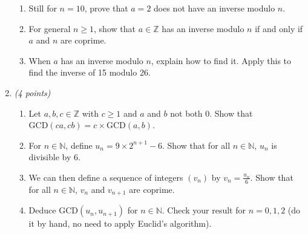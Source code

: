 \documentclass[12pt]{article}
\newcommand{\GCD}{\mathrm{GCD}}
\begin{document}
\begin{enumerate}
\begin{enumerate}

\item Still for \( n = 10 \), prove that \( a = 2 \) does not have an inverse modulo \( n \). \newline


\item For general \( n \geq 1 \), show that \( a \in \mathbb{Z} \) has an inverse modulo \( n \) if and only if \( a \) and \( n \) are coprime. \newline


\item When \( a \) has an inverse modulo \( n \), explain how to find it. Apply this to find the inverse of 15 modulo 26. \newline

\end{enumerate}

\item \emph{(4 points)}

\begin{enumerate}
\item Let \( a, b, c \in \mathbb{Z} \) with \( c \geq 1 \) and \( a \) and \( b \) not both 0. Show that \( \GCD(ca, cb) = c \times \GCD(a,b) \). \newline


\item For \( n \in \mathbb{N} \), define \( u_n = 9 \times 2^{n+1} - 6 \). Show that for all \( n \in \mathbb{N} \), \( u_n \) is divisible by 6. \newline


\item We can then define a sequence of integers \( (v_n) \) by \( v_n = \frac{u_n}{6} \). Show that for all \( n \in \mathbb{N} \), \( v_n \) and \( v_{n+1} \) are coprime. \newline


\item Deduce \( \GCD(u_n, u_{n+1}) \) for \( n \in \mathbb{N} \). Check your result for \( n = 0, 1, 2 \) (do it by hand, no need to apply Euclid's algorithm). \newline

\end{enumerate}

\end{enumerate}
\newpage %
\end{document}
